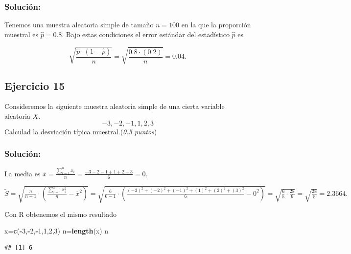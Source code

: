 \documentclass[
]{article}
\newenvironment{Shaded}{\begin{snugshade}}{\end{snugshade}}
\newcommand{\DecValTok}[1]{\textcolor[rgb]{0.00,0.00,0.81}{#1}}
\newcommand{\KeywordTok}[1]{\textcolor[rgb]{0.13,0.29,0.53}{\textbf{#1}}}
\newcommand{\NormalTok}[1]{#1}
\newcommand{\OperatorTok}[1]{\textcolor[rgb]{0.81,0.36,0.00}{\textbf{#1}}}
\begin{document}
\hypertarget{soluciuxf3n-13}{%
\subsubsection{Solución:}\label{soluciuxf3n-13}}

Tenemos una muestra aleatoria simple de tamaño \(n=100\) en la que la
proporción muestral es \(\hat{p}=0.8\). Bajo estas condiciones el error
estándar del estadístico \(\hat{p}\) es

\[\sqrt{\frac{\hat{p}\cdot (1- \hat{p})}{n}}=\sqrt{\frac{0.8\cdot (0.2)}{ n}}=0.04.\]

\hypertarget{ejercicio-15}{%
\subsection{Ejercicio 15}\label{ejercicio-15}}

Consideremos la siguiente muestra aleatoria simple de una cierta
variable aleatoria \(X\). \[-3,-2,-1,1,2,3\] Calculad la desviación
típica muestral.(\emph{0.5 puntos})

\hypertarget{soluciuxf3n-14}{%
\subsubsection{Solución:}\label{soluciuxf3n-14}}

La media es
\(\overline{x}=\frac{\sum_{i=1}^n x_i}{n}=\frac{-3-2-1+1+2+3}{6}=0.\)

\(\tilde{S}=\sqrt{\frac{n}{n-1}\cdot \left(\frac{\sum_{i=1}^n x_i^2}{n}-\overline{x}^2\right)}= \sqrt{\frac{6}{6-1}\cdot \left(\frac{(-3)^2+(-2)^2+(-1)^2+(1)^2+(2)^2+(3)^2}{6}-0^2\right)}= \sqrt{\frac{6}{5}\cdot \frac{28}{6}}=\sqrt{\frac{28}{5}}= 2.3664.\)

Con R obtenemos el mismo resultado

\begin{Shaded}
\begin{Highlighting}[]
\NormalTok{x=}\KeywordTok{c}\NormalTok{(}\OperatorTok{{-}}\DecValTok{3}\NormalTok{,}\OperatorTok{{-}}\DecValTok{2}\NormalTok{,}\OperatorTok{{-}}\DecValTok{1}\NormalTok{,}\DecValTok{1}\NormalTok{,}\DecValTok{2}\NormalTok{,}\DecValTok{3}\NormalTok{)}
\NormalTok{n=}\KeywordTok{length}\NormalTok{(x)}
\NormalTok{n}
\end{Highlighting}
\end{Shaded}

\begin{verbatim}
## [1] 6
\end{verbatim}
\end{document}
